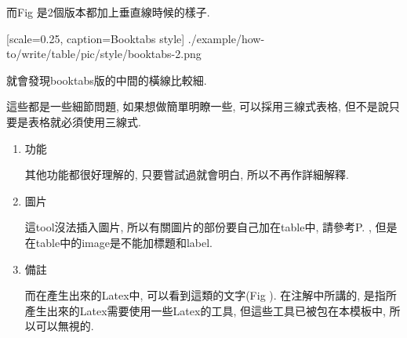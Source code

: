   而Fig 是2個版本都加上垂直線時候的樣子.

    {
      [scale=0.25,
      caption={Booktabs style}]
      {./example/how-to/write/table/pic/style/booktabs-2.png}
    }

  就會發現booktabs版的中間的橫線比較細.

  這些都是一些細節問題, 如果想做簡單明瞭一些, 可以採用三線式表格, 但不是說只要是表格就必須使用三線式.

{}

  \begin{enumerate}

  \item
  {
    功能

    其他功能都很好理解的, 只要嘗試過就會明白, 所以不再作詳細解釋.
  } %

  \item
  {
    圖片

    這tool沒法插入圖片, 所以有關圖片的部份要自己加在table中, 請參考P. , 但是在table中的image是不能加標題和label.
  } %

  \item
  {
    備註

    而在產生出來的Latex中, 可以看到這類的文字(Fig ). 在注解中所講的, 是指所產生出來的Latex需要使用一些Latex的工具, 但這些工具已被包在本模板中, 所以可以無視的.

  } %
  \end{enumerate}

\EndChapter

